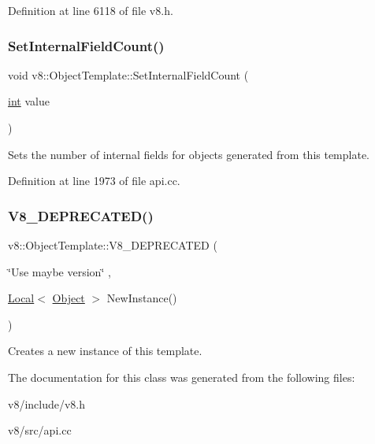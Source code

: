 Definition at line 6118 of file v8.\+h.

\mbox{\label{classv8_1_1ObjectTemplate_ab63916ac584a76bca8ba541f86ce9fce}} 
\subsubsection{\texorpdfstring{Set\+Internal\+Field\+Count()}{SetInternalFieldCount()}}
{\footnotesize\ttfamily void v8\+::\+Object\+Template\+::\+Set\+Internal\+Field\+Count (\begin{DoxyParamCaption}\item[{\mbox{\hyperlink{classint}{int}}}]{value }\end{DoxyParamCaption})}

Sets the number of internal fields for objects generated from this template. 

Definition at line 1973 of file api.\+cc.

\mbox{\label{classv8_1_1ObjectTemplate_ab13f4f7e5f31fc037f7a72cfbf89443d}} 
\subsubsection{\texorpdfstring{V8\+\_\+\+D\+E\+P\+R\+E\+C\+A\+T\+E\+D()}{V8\_DEPRECATED()}}
{\footnotesize\ttfamily v8\+::\+Object\+Template\+::\+V8\+\_\+\+D\+E\+P\+R\+E\+C\+A\+T\+ED (\begin{DoxyParamCaption}\item[{\char`\"{}Use maybe version\char`\"{}}]{,  }\item[{\mbox{\hyperlink{classv8_1_1Local}{Local}}$<$ \mbox{\hyperlink{classv8_1_1Object}{Object}} $>$ }]{New\+Instance() }\end{DoxyParamCaption})}

Creates a new instance of this template. 

The documentation for this class was generated from the following files\+:\begin{DoxyCompactItemize}
\item 
v8/include/v8.\+h\item 
v8/src/api.\+cc\end{DoxyCompactItemize}
